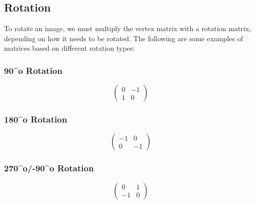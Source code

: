 \documentclass[a4paper,10pt]{article}
\begin{document}
      \subsection{Rotation}
        To rotate an image, we must multiply the vertex matrix with a rotation matrix, depending on how it needs to be rotated. The following are some examples of matrices based on different rotation types:
        \subsubsection{90^o Rotation}
          \begin{equation*}
            \begin{pmatrix}
              0 & -1\\1 & 0
            \end{pmatrix}
          \end{equation*}

        \subsubsection{180^o Rotation}
          \begin{equation*}
            \begin{pmatrix}
              -1 & 0\\0 & -1
            \end{pmatrix}
          \end{equation*}

        \subsubsection{270^o/-90^o Rotation}
          \begin{equation*}
            \begin{pmatrix}
              0 & 1\\-1 & 0
            \end{pmatrix}
          \end{equation*}
\end{document}
